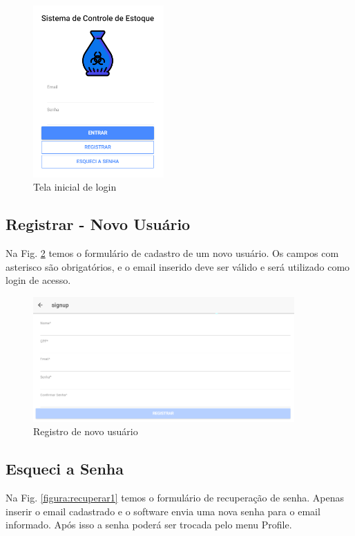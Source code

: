 \documentclass[letterpaper, 12 pt]{article}
\begin{document}
\begin{figure}[h]
\centering %
\includegraphics[width=5cm]{imagens/login1.PNG}
\caption{Tela inicial de login}
\label{figura:login1}
\end{figure}
\newpage

\subsection{Registrar - Novo Usuário}
Na  Fig. \ref{figura:registrar1} temos o formulário de cadastro de um novo usuário. Os campos com asterisco são obrigatórios, e o email inserido deve ser válido e será utilizado como login de acesso. 

\begin{figure}[h]
\centering %
\includegraphics[width=10cm]{imagens/registrar1.PNG}
\caption{Registro de novo usuário}
\label{figura:registrar1}
\end{figure}

\subsection{Esqueci a Senha}
Na  Fig. \ref{figura:recuperar1} temos o formulário de recuperação de senha. Apenas inserir o email cadastrado e o software envia uma nova senha para o email informado. Após isso a senha poderá ser trocada pelo menu Profile.
\end{document}
